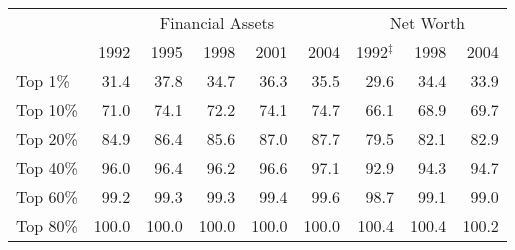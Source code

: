 \begin{center}

\begin{tabular}{lrrrrrrrr}
\toprule
& \multicolumn{5}{c}{Financial Assets} &  \multicolumn{3}{c}{Net Worth} \\
\cmidrule(r){2-6}\cmidrule(r){3-6}\cmidrule(r){7-9}
& 1992 & 1995 & 1998 & 2001 & 2004 & 1992$^{\ddagger}$ &
1998 & 2004 \\ \midrule
Top 1\% & 31.4 & 37.8 & 34.7 & 36.3 & 35.5 &  29.6 &
34.4 & 33.9 \\
Top 10\% & 71.0 & 74.1 & 72.2 & 74.1 & 74.7 &  66.1 &
68.9 & 69.7 \\
Top 20\% & 84.9 & 86.4 & 85.6 & 87.0 & 87.7 &  79.5 &
82.1 & 82.9 \\
Top 40\% & 96.0 & 96.4 & 96.2 & 96.6 & 97.1 &  92.9 &
94.3 & 94.7 \\
Top 60\% & 99.2 & 99.3 & 99.3 & 99.4 & 99.6 &  98.7 &
99.1 & 99.0 \\
Top 80\% & 100.0 & 100.0 & 100.0 & 100.0 & 100.0 &  100.4 & 100.4 & 100.2 \\ \bottomrule
\end{tabular}

\end{center} 
